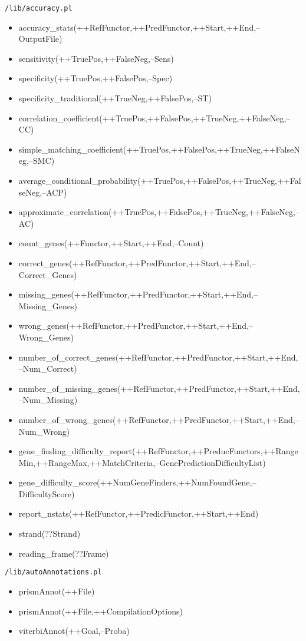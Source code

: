

\texttt{/lib/accuracy.pl} \\
%
\begin{itemize}
\item accuracy\_stats(++RefFunctor,++PredFunctor,++Start,++End,--OutputFile)
\item sensitivity(++TruePos,++FalseNeg,--Sens)
\item specificity(++TruePos,++FalsePos,--Spec)
\item specificity_traditional(++TrueNeg,++FalsePos,--ST)
\item correlation_coefficient(++TruePos,++FalsePos,++TrueNeg,++FalseNeg,--CC)
\item simple_matching_coefficient(++TruePos,++FalsePos,++TrueNeg,++FalseNeg,--SMC)
\item average_conditional_probability(++TruePos,++FalsePos,++TrueNeg,++FalseNeg,--ACP)
\item approximate_correlation(++TruePos,++FalsePos,++TrueNeg,++FalseNeg,--AC)
\item count\_genes(++Functor,++Start,++End,--Count)
\item correct\_genes(++RefFunctor,++PredFunctor,++Start,++End,--Correct\_Genes)
\item missing\_genes(++RefFunctor,++PredFunctor,++Start,++End,--Missing\_Genes)
\item wrong\_genes(++RefFunctor,++PredFunctor,++Start,++End,--Wrong\_Genes)
\item number\_of\_correct\_genes(++RefFunctor,++PredFunctor,++Start,++End,--Num\_Correct)
\item number\_of\_missing\_genes(++RefFunctor,++PredFunctor,++Start,++End,--Num\_Missing)
\item number\_of\_wrong\_genes(++RefFunctor,++PredFunctor,++Start,++End,--Num\_Wrong)
\item gene\_finding\_difficulty\_report(++RefFunctor,++PreducFunctors,++RangeMin,++RangeMax,++MatchCriteria,--GenePredictionDifficultyList)
\item gene\_difficulty\_score(++NumGeneFinders,++NumFoundGene,--DifficultyScore)
\item report\_nstats(++RefFunctor,++PredicFunctor,++Start,++End)
\item strand(??Strand)
\item reading\_frame(??Frame)
\end{itemize}

\texttt{/lib/autoAnnotations.pl} \\
%
\begin{itemize}
\item prismAnnot(++File)
\item prismAnnot(++File,++CompilationOptions)
\item viterbiAnnot(++Goal,--Proba)
\end{itemize}


